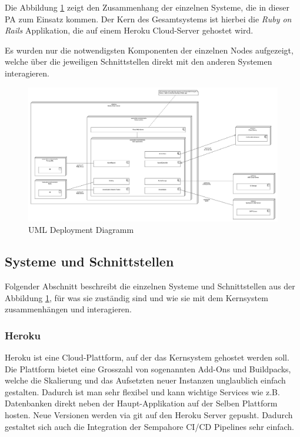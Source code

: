 Die Abbildung \ref{fig:deployment} zeigt den Zusammenhang der einzelnen Systeme, die in dieser PA zum Einsatz kommen.
Der Kern des Gesamtsystems ist hierbei die \emph{Ruby on Rails} Applikation, die auf einem Heroku Cloud-Server gehostet wird.

Es wurden nur die notwendigsten Komponenten der einzelnen Nodes aufgezeigt, welche über die jeweiligen Schnittstellen direkt mit den anderen Systemen interagieren.

\begin{figure}[h]
    \centering
    \includegraphics[width=\textwidth]{images/deployment.png}
    \caption{UML Deployment Diagramm}
    \label{fig:deployment}
\end{figure}

\subsection{Systeme und Schnittstellen}

Folgender Abschnitt beschreibt die einzelnen Systeme und Schnittstellen aus der Abbildung \ref{fig:deployment},
für was sie zuständig sind und wie sie mit dem Kernsystem zusammenhängen und interagieren.

\subsubsection{Heroku}
Heroku ist eine Cloud-Plattform, auf der das Kernsystem gehostet werden soll. Die Plattform bietet eine
Grosszahl von sogenannten Add-Ons und Buildpacks, welche die Skalierung und das Aufsetzten neuer Instanzen unglaublich einfach gestalten.
Dadurch ist man sehr flexibel und kann wichtige Services wie z.B. Datenbanken direkt neben der Haupt-Applikation auf der Selben Plattform hosten.
Neue Versionen werden via git auf den Heroku Server gepusht. Dadurch gestaltet sich auch die Integration der Sempahore CI/CD Pipelines sehr einfach.

